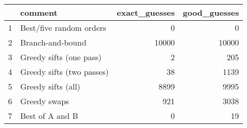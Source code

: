 \begin{table}[ht]
\centering
\begin{tabular}{rlrr}
  \hline
 & comment & exact\_guesses & good\_guesses \\ 
  \hline
1 & Best/five random orders &   0 &   0 \\ 
  2 & Branch-and-bound & 10000 & 10000 \\ 
  3 & Greedy sifts (one pass) &   2 & 205 \\ 
  4 & Greedy sifts (two passes) &  38 & 1139 \\ 
  5 & Greedy sifts (all) & 8899 & 9995 \\ 
  6 & Greedy swaps & 921 & 3038 \\ 
  7 & Best of A and B &   0 &  19 \\ 
   \hline
\end{tabular}
\end{table}
